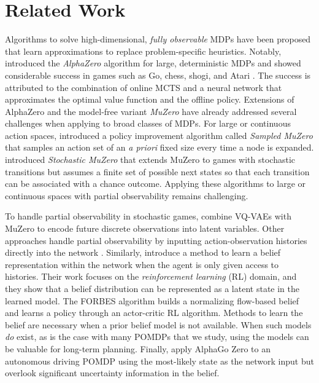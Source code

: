 \section{Related Work}
Algorithms to solve high-dimensional, \textit{fully observable} MDPs have been proposed that learn approximations to replace problem-specific heuristics.
Notably, \textcite{silver2018general} introduced the \textit{AlphaZero} algorithm for large, deterministic MDPs and showed considerable success in games such as Go, chess, shogi, and Atari \cite{silver2018general, schrittwieser2020mastering}.
The success is attributed to the combination of online MCTS and a neural network that approximates the optimal value function and the offline policy.
Extensions of AlphaZero and the model-free variant \textit{MuZero} \cite{schrittwieser2020mastering} have already addressed several challenges when applying to broad classes of MDPs.
For large or continuous action spaces, \textcite{hubert2021learning} introduced a policy improvement algorithm called \textit{Sampled MuZero} that samples an action set of an \textit{a priori} fixed size every time a node is expanded.
\textcite{antonoglou2021planning} introduced \textit{Stochastic MuZero} that extends MuZero to games with stochastic transitions but assumes a finite set of possible next states so that each transition can be associated with a chance outcome.
Applying these algorithms to large or continuous spaces with partial observability remains challenging.

To handle partial observability in stochastic games, \textcite{ozair2021vector} combine VQ-VAEs with MuZero to encode future discrete observations into latent variables.
Other approaches handle partial observability by inputting action-observation histories directly into the network \cite{kimura2020development, vinyals2019grandmaster}.
Similarly, \textcite{igl2018deep} introduce a method to learn a belief representation within the network when the agent is only given access to histories.
Their work focuses on the \textit{reinforcement learning} (RL) domain, and they show that a belief distribution can be represented as a latent state in the learned model.
The FORBES algorithm \cite{chen2022flow} builds a normalizing flow-based belief and learns a policy through an actor-critic RL algorithm.
Methods to learn the belief are necessary when a prior belief model is not available.
When such models \textit{do} exist, as is the case with many POMDPs that we study, using the models can be valuable for long-term planning.
Finally, \textcite{hoel2019combining} apply AlphaGo Zero \cite{silver2017mastering} to an autonomous driving POMDP using the most-likely state as the network input but overlook significant uncertainty information in the belief.


